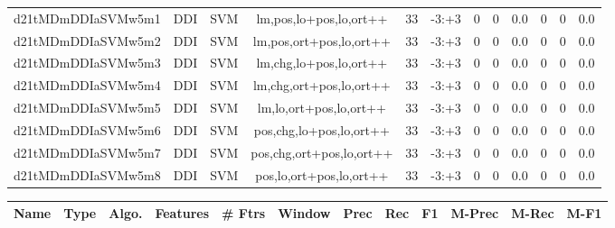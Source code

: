 \documentclass[a4paper]{article}
\begin{document}
\begin{landscape}
\begin{center}
\begin{tabular}{ |c|c|c|c|c|c|c|c|c|c|c|c|}
 
 	
 	\small{ d21tMDmDDIaSVMw5m1 } & \small{ DDI} & \small{  SVM }  & lm,pos,lo+pos,lo,ort++  &  33 &  \small{  -3:+3 }  &  0 & 0 & 0.0  &  0 & 0 & 0.0 \\
 	

 
 	
 	\small{ d21tMDmDDIaSVMw5m2 } & \small{ DDI} & \small{  SVM }  & lm,pos,ort+pos,lo,ort++  &  33 &  \small{  -3:+3 }  &  0 & 0 & 0.0  &  0 & 0 & 0.0 \\
 	

 
 	
 	\small{ d21tMDmDDIaSVMw5m3 } & \small{ DDI} & \small{  SVM }  & lm,chg,lo+pos,lo,ort++  &  33 &  \small{  -3:+3 }  &  0 & 0 & 0.0  &  0 & 0 & 0.0 \\
 	

 
 	
 	\small{ d21tMDmDDIaSVMw5m4 } & \small{ DDI} & \small{  SVM }  & lm,chg,ort+pos,lo,ort++  &  33 &  \small{  -3:+3 }  &  0 & 0 & 0.0  &  0 & 0 & 0.0 \\
 	

 
 	
 	\small{ d21tMDmDDIaSVMw5m5 } & \small{ DDI} & \small{  SVM }  & lm,lo,ort+pos,lo,ort++  &  33 &  \small{  -3:+3 }  &  0 & 0 & 0.0  &  0 & 0 & 0.0 \\
 	

 
 	
 	\small{ d21tMDmDDIaSVMw5m6 } & \small{ DDI} & \small{  SVM }  & pos,chg,lo+pos,lo,ort++  &  33 &  \small{  -3:+3 }  &  0 & 0 & 0.0  &  0 & 0 & 0.0 \\
 	

 
 	
 	\small{ d21tMDmDDIaSVMw5m7 } & \small{ DDI} & \small{  SVM }  & pos,chg,ort+pos,lo,ort++  &  33 &  \small{  -3:+3 }  &  0 & 0 & 0.0  &  0 & 0 & 0.0 \\
 	

 
 	
 	\small{ d21tMDmDDIaSVMw5m8 } & \small{ DDI} & \small{  SVM }  & pos,lo,ort+pos,lo,ort++  &  33 &  \small{  -3:+3 }  &  0 & 0 & 0.0  &  0 & 0 & 0.0 \\
 	
 \hline
\end{tabular}
\end{center}




\begin{center}
\begin{tabular}{ |c|c|c|c|c|c|c|c|c|c|c|c|} 
 \hline
 	Name & Type & Algo. & Features & \# Ftrs & Window & Prec & Rec & F1 & M-Prec & M-Rec & M-F1\\
 \hline


\end{tabular}
\end{center}
\end{landscape}
\end{document}
